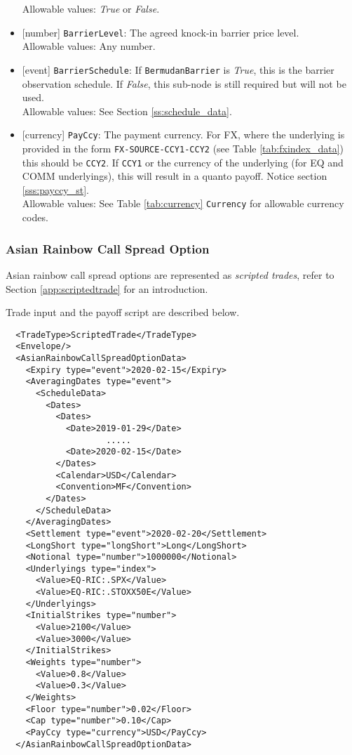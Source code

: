 \begin{itemize}
  Allowable values: \emph{True} or \emph{False}.
  \item{}[number] \lstinline!BarrierLevel!: The agreed knock-in barrier price level. \\
  Allowable values: Any number.
  \item{}[event] \lstinline!BarrierSchedule!: If \lstinline!BermudanBarrier! is \emph{True}, this is the barrier observation
  schedule. If \emph{False}, this sub-node is still required but will not be used. \\
  Allowable values: See Section \ref{ss:schedule_data}.
  \item{}[currency] \lstinline!PayCcy!: The payment currency. For FX, where the underlying is provided
      in the form \lstinline!FX-SOURCE-CCY1-CCY2! (see Table \ref{tab:fxindex_data}) this should
      be \lstinline!CCY2!. If \lstinline!CCY1! or the currency of the underlying (for EQ and
      COMM underlyings), this will result in a quanto payoff. Notice section \ref{sss:payccy_st}. \\
        Allowable values: See Table \ref{tab:currency} \lstinline!Currency! for allowable currency codes.
\end{itemize}

\subsubsection*{Asian Rainbow Call Spread Option}

Asian rainbow call spread options are represented as {\em scripted trades}, refer to
Section \ref{app:scriptedtrade} for an introduction.

Trade input and the payoff script are described below.

\begin{verbatim}
  <TradeType>ScriptedTrade</TradeType>
  <Envelope/>
  <AsianRainbowCallSpreadOptionData>
    <Expiry type="event">2020-02-15</Expiry>
    <AveragingDates type="event">
      <ScheduleData>
        <Dates>
          <Dates>
            <Date>2019-01-29</Date>
                    .....
            <Date>2020-02-15</Date>
          </Dates>
          <Calendar>USD</Calendar>
          <Convention>MF</Convention>
        </Dates>
      </ScheduleData>
    </AveragingDates>
    <Settlement type="event">2020-02-20</Settlement>
    <LongShort type="longShort">Long</LongShort>
    <Notional type="number">1000000</Notional>
    <Underlyings type="index">
      <Value>EQ-RIC:.SPX</Value>
      <Value>EQ-RIC:.STOXX50E</Value>
    </Underlyings>
    <InitialStrikes type="number">
      <Value>2100</Value>
      <Value>3000</Value>
    </InitialStrikes>
    <Weights type="number">
      <Value>0.8</Value>
      <Value>0.3</Value>
    </Weights>
    <Floor type="number">0.02</Floor>
    <Cap type="number">0.10</Cap>
    <PayCcy type="currency">USD</PayCcy>
  </AsianRainbowCallSpreadOptionData>
\end{verbatim}

